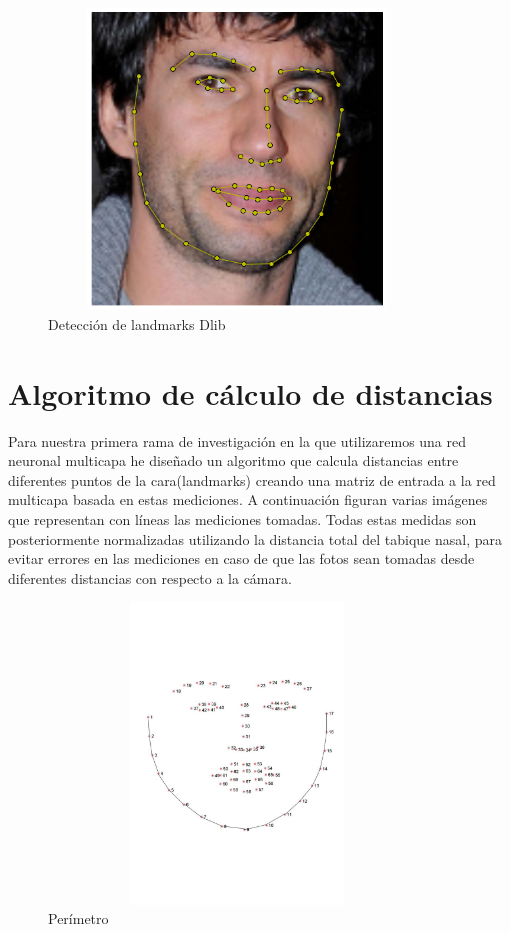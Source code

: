 \documentclass{article}
\begin{document}
\begin{figure}[H]
  \centering
  \includegraphics[width=100mm, height=80mm]{images/landmarked_image.png}
  \caption{Detección de landmarks Dlib}
\end{figure}

\section{Algoritmo de cálculo de distancias}
Para nuestra primera rama de investigación en la que utilizaremos una red neuronal multicapa he diseñado un algoritmo que calcula distancias entre diferentes puntos de la cara(landmarks) creando una matriz de entrada a la red multicapa basada en estas mediciones. A continuación figuran varias imágenes que representan con líneas las mediciones tomadas. Todas estas medidas son posteriormente normalizadas utilizando la distancia total del tabique nasal, para evitar errores en las mediciones en caso de que las fotos sean tomadas desde diferentes distancias con respecto a la cámara.

\begin{figure}[H]
  \centering
  \includegraphics[width=100mm, height=80mm]{images/border_distances.jpg}
  \caption{Perímetro}
\end{figure}
\end{document}
